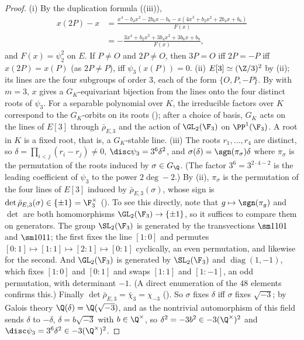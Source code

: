 \begin{proof}
(i) By the duplication formula ((iii)),
\begin{align*}
x(2P)-x&=\frac{x^4-b_4x^2-2b_6x-b_8-x(4x^3+b_2x^2+2b_4x+b_6)}{F(x)}\\
&=-\frac{3x^4+b_2x^3+3b_4x^2+3b_6x+b_8}{F(x)},
\end{align*}
and $F(x)=\psi_2^2$ on $E$. If $P\ne O$ and $2P\ne O$, then $3P=O$ iff $2P=-P$ iff $x(2P)=x(P)$ (as $2P\ne P$), iff $\psi_3(x(P))=0$.
(ii) $E[3]\simeq(\Z/3)^2$ by (ii); its lines are the four subgroups of order $3$, each of the form $\{O,P,-P\}$. By  with
$m=3$, $x$ gives a $G_K$-equivariant bijection from the lines onto the four distinct roots of $\psi_3$. For a separable polynomial over $K$, the irreducible factors over $K$
correspond to the $G_K$-orbits on its roots (); after a choice of basis, $G_K$ acts on the lines of $E[3]$ through $\bar\rho_{E,3}$ and the action of
$\GL_2(\F_3)$ on $\PP^1(\F_3)$. A root in $K$ is a fixed root, that is, a $G_K$-stable line.
(iii) The roots $r_1,\dots,r_4$ are distinct, so $\delta=\prod_{i<j}(r_i-r_j)\ne0$, $\disc\psi_3=3^6\delta^2$, and $\sigma(\delta)=\sgn(\pi_\sigma)\delta$ where $\pi_\sigma$ is the permutation of
the roots induced by $\sigma\in G_\Q$. (The factor $3^6=3^{2\cdot4-2}$ is the leading coefficient of $\psi_3$ to the power $2\deg-2$.) By (ii), $\pi_\sigma$ is the permutation of the four lines of $E[3]$ induced by $\bar\rho_{E,3}(\sigma)$, whose sign is $\det\bar\rho_{E,3}(\sigma)\in\{\pm1\}=\F_3^\times$
(). To see this directly, note that $g\mapsto\sgn(\pi_g)$ and $\det$ are both homomorphisms $\GL_2(\F_3)\to\{\pm1\}$, so it suffices to compare them on
generators. The group $\SL_2(\F_3)$ is generated by the transvections $\sm1101$ and $\sm1011$; the first fixes the line $[1:0]$ and permutes $[0:1]\mapsto[1:1]\mapsto[2:1]\mapsto[0:1]$
cyclically, an even permutation, and likewise for the second. And $\GL_2(\F_3)$ is generated by $\SL_2(\F_3)$ and $\operatorname{diag}(1,-1)$, which fixes $[1:0]$ and $[0:1]$ and swaps
$[1:1]$ and $[1:-1]$, an odd permutation, with determinant $-1$. (A direct enumeration of the $48$ elements confirms this.) Finally $\det\bar\rho_{E,3}=\bar\chi_3=\chi_{-3}$
(). So $\sigma$ fixes $\delta$ iff $\sigma$ fixes $\sqrt{-3}$; by Galois theory $\Q(\delta)=\Q(\sqrt{-3})$, and as the nontrivial automorphism of this field
sends $\delta$ to $-\delta$, $\delta=b\sqrt{-3}$ with $b\in\Q^\times$, so $\delta^2=-3b^2\in-3(\Q^\times)^2$ and $\disc\psi_3=3^6\delta^2\in-3(\Q^\times)^2$.
\end{proof}

